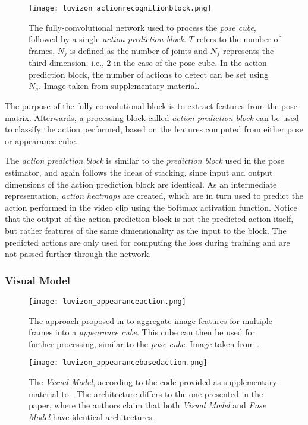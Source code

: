 \begin{figure}[htb!]
    \centering
    \texttt{[image: luvizon\_actionrecognitionblock.png]}
    \caption{The fully-convolutional network used to process the \textit{pose cube}, followed by a single \textit{action prediction block}. $T$ refers to the number of frames, $N_j$ is defined as the number of joints and $N_f$ represents the third dimension, i.e., $2$ in the case of the pose cube. In the action prediction block, the number of actions to detect can be set using $N_a$. Image taken from \cite{luvizon_2d/3d_2018} supplementary material.}
    \label{fig:luvizon_actionrecognitionblock}
\end{figure}

The purpose of the fully-convolutional block is to extract features from the pose matrix.
Afterwards, a processing block called \textit{action prediction block} can be used to classify the action performed, based on the features computed from either pose or appearance cube. 

The \textit{action prediction block} is similar to the \textit{prediction block} used in the pose estimator, and again follows the ideas of stacking, since input and output dimensions of the action prediction block are identical.
As an intermediate representation, \textit{action heatmaps} are created, which are in turn used to predict the action performed in the video clip using the Softmax activation function.
Notice that the output of the action prediction block is not the predicted action itself, but rather features of the same dimensionality as the input to the block.
The predicted actions are only used for computing the loss during training and are not passed further through the network.

\subsubsection{Visual Model}
\label{sec:deephar_visualmodel}
\begin{figure}[htb!]
    \centering
    \texttt{[image: luvizon\_appearanceaction.png]}
    \caption{The approach proposed in \cite{luvizon_2d/3d_2018} to aggregate image features for multiple frames into a \textit{appearance cube}. This cube can then be used for further processing, similar to the \textit{pose cube}. Image taken from \cite{luvizon_2d/3d_2018}.}
    \label{fig:luvizon_appearanceaction}
\end{figure}

\begin{figure}[htb!]
    \centering
    \texttt{[image: luvizon\_appearancebasedaction.png]}
    \caption{The \textit{Visual Model}, according to the code provided as supplementary material to \cite{luvizon_2d/3d_2018}. The architecture differs to the one presented in the paper, where the authors claim that both \textit{Visual Model} and \textit{Pose Model} have identical architectures.}
    \label{fig:luvizon_appearancbasedeaction}
\end{figure}

